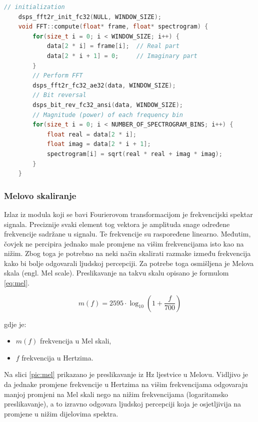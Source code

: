 \begin{lstlisting}[language=C++, caption=FFT, label=code:fft]
    // initialization 
    dsps_fft2r_init_fc32(NULL, WINDOW_SIZE);
    void FFT::compute(float* frame, float* spectrogram) {
        for(size_t i = 0; i < WINDOW_SIZE; i++) {
            data[2 * i] = frame[i];  // Real part
            data[2 * i + 1] = 0;     // Imaginary part
        }
        // Perform FFT
        dsps_fft2r_fc32_ae32(data, WINDOW_SIZE);
        // Bit reversal
        dsps_bit_rev_fc32_ansi(data, WINDOW_SIZE);
        // Magnitude (power) of each frequency bin
        for(size_t i = 0; i < NUMBER_OF_SPECTROGRAM_BINS; i++) {
            float real = data[2 * i];
            float imag = data[2 * i + 1];
            spectrogram[i] = sqrt(real * real + imag * imag);
        }
    }
\end{lstlisting}


\subsubsection{Melovo skaliranje}
\label{sec:mel}
Izlaz iz modula koji se bavi Fourierovom transformacijom je frekvencijski spektar signala.
Preciznije svaki element tog vektora je amplituda snage određene frekvencije sadržane u signalu.
Te frekvencije su raspoređene linearno. Međutim, čovjek ne percipira jednako male promjene 
na višim frekvencijama isto kao na nižim. Zbog toga je potrebno na neki način skalirati
razmake između frekvencija kako bi bolje odgovarali ljudskoj percepciji. Za potrebe toga
osmišljena je Melova skala (engl. Mel scale). Preslikavanje na takvu skalu opisano je formulom
\ref{eq:mel}.

\begin{equation}
    m(f) = 2595 \cdot \log_{10}\left(1 + \frac{f}{700}\right)
    \label{eq:mel}
\end{equation}

gdje je:
\begin{itemize}
    \item \(m(f)\) frekvencija u Mel skali,
    \item \(f\) frekvencija u Hertzima.
\end{itemize}

Na slici \ref{pic:mel} prikazano je preslikavanje iz Hz ljestvice u Melovu. Vidljivo je da
jednake promjene frekvencije u Hertzima na višim frekvencijama odgovaraju manjoj promjeni 
na Mel skali nego na nižim frekvencijama (logaritamsko preslikavanje), a to izravno
odgovara ljudskoj percepciji koja je osjetljivija na promjene u nižim dijelovima spektra.

